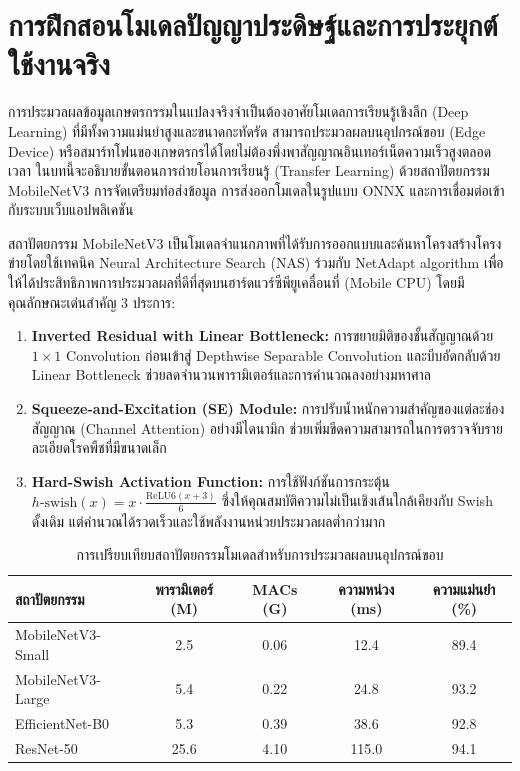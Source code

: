 \chapter{การฝึกสอนโมเดลปัญญาประดิษฐ์และการประยุกต์ใช้งานจริง}
\label{ch:model_training_deploy}

การประมวลผลข้อมูลเกษตรกรรมในแปลงจริงจำเป็นต้องอาศัยโมเดลการเรียนรู้เชิงลึก (Deep Learning) ที่มีทั้งความแม่นยำสูงและขนาดกะทัดรัด สามารถประมวลผลบนอุปกรณ์ขอบ (Edge Device) หรือสมาร์ทโฟนของเกษตรกรได้โดยไม่ต้องพึ่งพาสัญญาณอินเทอร์เน็ตความเร็วสูงตลอดเวลา ในบทนี้จะอธิบายขั้นตอนการถ่ายโอนการเรียนรู้ (Transfer Learning) ด้วยสถาปัตยกรรม MobileNetV3 การจัดเตรียมท่อส่งข้อมูล การส่งออกโมเดลในรูปแบบ ONNX และการเชื่อมต่อเข้ากับระบบเว็บแอปพลิเคชัน

\label{sec:mobilenetv3_arch}

สถาปัตยกรรม MobileNetV3 เป็นโมเดลจำแนกภาพที่ได้รับการออกแบบและค้นหาโครงสร้างโครงข่ายโดยใช้เทคนิค Neural Architecture Search (NAS) ร่วมกับ NetAdapt algorithm เพื่อให้ได้ประสิทธิภาพการประมวลผลที่ดีที่สุดบนฮาร์ดแวร์ซีพียูเคลื่อนที่ (Mobile CPU) โดยมีคุณลักษณะเด่นสำคัญ 3 ประการ:

\begin{enumerate}
    \item \textbf{Inverted Residual with Linear Bottleneck:} การขยายมิติของชั้นสัญญาณด้วย $1 \times 1$ Convolution ก่อนเข้าสู่ Depthwise Separable Convolution และบีบอัดกลับด้วย Linear Bottleneck ช่วยลดจำนวนพารามิเตอร์และการคำนวณลงอย่างมหาศาล
    \item \textbf{Squeeze-and-Excitation (SE) Module:} การปรับน้ำหนักความสำคัญของแต่ละช่องสัญญาณ (Channel Attention) อย่างมีไดนามิก ช่วยเพิ่มขีดความสามารถในการตรวจจับรายละเอียดโรคพืชที่มีขนาดเล็ก
    \item \textbf{Hard-Swish Activation Function:} การใช้ฟังก์ชันการกระตุ้น $h\text{-swish}(x) = x \cdot \frac{\text{ReLU6}(x+3)}{6}$ ซึ่งให้คุณสมบัติความไม่เป็นเชิงเส้นใกล้เคียงกับ Swish ดั้งเดิม แต่คำนวณได้รวดเร็วและใช้พลังงานหน่วยประมวลผลต่ำกว่ามาก
\end{enumerate}

\begin{table}[htbp]
\centering
\caption{การเปรียบเทียบสถาปัตยกรรมโมเดลสำหรับการประมวลผลบนอุปกรณ์ขอบ}
\label{tab:model_comparison}
\begin{tabular}{lcccc}
\toprule
\textbf{สถาปัตยกรรม} & \textbf{พารามิเตอร์ (M)} & \textbf{MACs (G)} & \textbf{ความหน่วง (ms)} & \textbf{ความแม่นยำ (\%)} \\
\midrule
MobileNetV3-Small & 2.5 & 0.06 & 12.4 & 89.4 \\
MobileNetV3-Large & 5.4 & 0.22 & 24.8 & 93.2 \\
EfficientNet-B0   & 5.3 & 0.39 & 38.6 & 92.8 \\
ResNet-50         & 25.6 & 4.10 & 115.0 & 94.1 \\
\bottomrule
\end{tabular}
\end{table}

